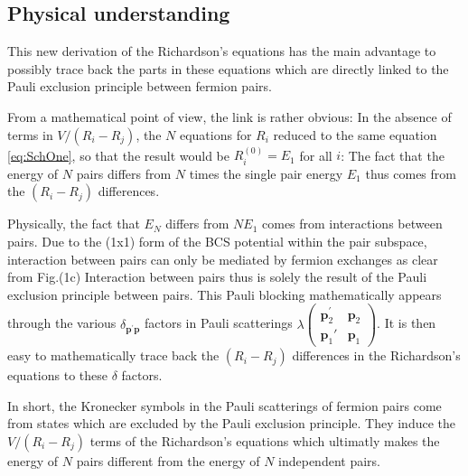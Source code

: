 \documentclass[aps,prb,superscriptaddress,twocolumn]{revtex4}
\newcommand{\vp}{\ensuremath{\mathbf{p}}}
\begin{document}
\subsection{Physical understanding}

This new derivation of the Richardson's equations has the main advantage to
possibly trace back the parts in these equations which are directly linked
to the Pauli exclusion principle between fermion pairs.

From a mathematical point of view, the link is rather obvious: In the
absence of terms in $V/(R_i-R_j)$, the $N$ equations for $R_i$ reduced to
the same equation \eqref{eq:SchOne}, so that the result would be $R^{(0)}_i=%
E _1$ for all $i$: The fact that the energy of $N$ pairs differs
from $N$ times the single pair energy $E_1$ thus comes from the $(R_i-R_j)$
differences.

Physically, the fact that $E _N$ differs from $NE _1$
comes from interactions between pairs. Due to the (1x1) form of the BCS
potential within the pair subspace, interaction between pairs can only be mediated by fermion
exchanges as clear from Fig.(1c) 
Interaction between pairs thus
is solely the result of the Pauli exclusion principle between pairs. This
Pauli blocking mathematically appears through the various $\delta_{\mathbf{p}
^{\prime}\mathbf{p} }$ factors in Pauli scatterings $\lambda\left(%
\begin{smallmatrix}\vp^\prime_2&\vp_2\\\vp_1'&\vp_1\end{smallmatrix}\right)  $. It
is then easy to mathematically trace back the $(R_i-R_j)$ differences
 in the Richardson's equations to these $\delta$ factors.

In short, the Kronecker symbols in the Pauli scatterings of fermion pairs
come from states which are excluded by the Pauli exclusion principle. They induce the $V/(R_i-R_j)$ terms
of the Richardson's equations which ultimatly makes the energy of $N$ pairs different
from the energy of $N$ independent pairs.
\end{document}
